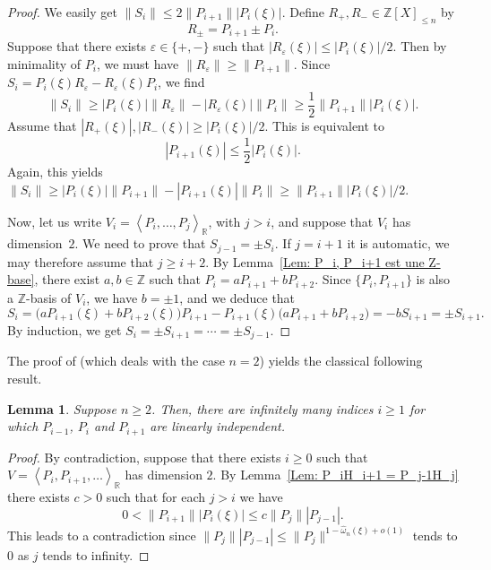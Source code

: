 \documentclass[JEP,XML,SOM,Unicode,NoFloatCountersInSection,published]{cedram}
\newcommand\bR{\mathbb{R}}
\newcommand\bZ{\mathbb{Z}}
\newcommand\ee{\varepsilon}
\newcommand\homega{\widehat{\omega}}\newcommand\HH{\mathcal{H}}
\newcommand{\normH}[1]{\|#1\|}
\newcommand{\Vect}[2][]{\left\la #2\right\ra_{#1}}
\let\la\langle
\let\ra\rangle
\theoremstyle{definition}
\theoremstyle{plain}
\newtheorem{Lem}[Def]{Lemma}
\begin{document}
\begin{proof}
We easily get $\normH{S_i} \leq 2\normH{P_{i+1}}|P_i(\xi)|$. Define $R_+, R_- \in\bZ[X]_{\leq n}$ by
\[
R_\pm = P_{i+1} \pm P_i.
\]
Suppose that there exists $\ee\in\{+,-\}$ such that $|R_\ee(\xi)| \leq |P_i(\xi)|/2$. Then by minimality of $P_i$, we must have $\normH{R_\ee} \geq \normH{P_{i+1}}$. Since $S_i = P_i(\xi)R_\ee - R_\ee(\xi) P_i$, we find
\begin{equation*}
\normH{S_i} \geq |P_i(\xi)|\normH{R_\ee} - |R_\ee(\xi)|\normH{P_i} \geq \frac{1}{2} \normH{P_{i+1}}|P_i(\xi)|.
\end{equation*}
Assume that $|R_+(\xi)|, |R_-(\xi)| \geq |P_i(\xi)|/2$. This is equivalent to
\[
|P_{i+1}(\xi)| \leq \frac{1}{2}|P_i(\xi)|.
\]
Again, this yields $\normH{S_i} \geq |P_i(\xi)|\normH{P_{i+1}} - |P_{i+1}(\xi)|\normH{P_i} \geq \normH{P_{i+1}}|P_i(\xi)|/2$.

Now, let us write $V_i = \Vect[\bR]{P_i,\dots,P_j}$, with $j > i$, and suppose that $V_i$ has dimension~$2$. We need to prove that $S_{j-1} = \pm S_i$. If $j=i+1$ it is automatic, we may therefore assume that $j\geq i+2$. By Lemma~\ref{Lem: P_i, P_i+1 est une Z-base}, there exist $a,b\in\bZ$ such that $P_i = aP_{i+1} + bP_{i+2}$. Since $\{P_i,P_{i+1}\}$ is also a $\bZ$-basis of $V_i$, we have $b=\pm 1$, and we deduce that
\[
S_i = \big(aP_{i+1}(\xi) + bP_{i+2}(\xi)\big)P_{i+1} - P_{i+1}(\xi)\big(aP_{i+1} + bP_{i+2}\big) = -bS_{i+1} = \pm S_{i+1}.
\]
By induction, we get $S_i = \pm S_{i+1} = \cdots = \pm S_{j-1}$.
\end{proof}

The proof of \cite[Lem.\,3]{davenport1967approximation} (which deals with the case $n=2$) yields the classical following result.

\begin{Lem}
\label{lem: I infini}
Suppose $n\geq 2$. Then, there are infinitely many indices $i\geq 1$ for which $P_{i-1}$, $P_i$ and $P_{i+1}$ are linearly independent.
\end{Lem}

\begin{proof}
By contradiction, suppose that there exists $i\geq 0$ such that $V=\Vect[\bR]{P_i,P_{i+1},\dots}$ has dimension $2$. By Lemma~\ref{Lem: P_iH_i+1 = P_j-1H_j} there exists $c>0$ such that for each $j > i$ we have
\[
0 < \normH{P_{i+1}}|P_i(\xi)| \leq c\normH{P_j}|P_{j-1}|.
\]
This leads to a contradiction since $\normH{P_j}|P_{j-1}| \leq \normH{P_j}^{1-\homega_n(\xi)+o(1)}$ tends to $0$ as $j$ tends to infinity.
\end{proof}
\end{document}
